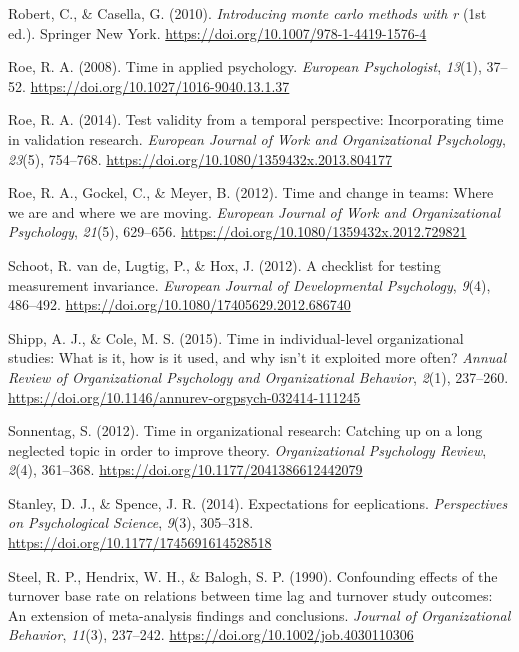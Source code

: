 \documentclass[
  english,
  man,floatsintext]{apa7}
\newlength{\cslhangindent}
\newlength{\cslentryspacingunit} %
\newenvironment{CSLReferences}[2] %
 {%
  \setlength{\parindent}{0pt}
  \ifodd #1
  \let\oldpar\par
  \def\par{\hangindent=\cslhangindent\oldpar}
  \fi
  \setlength{\parskip}{#2\cslentryspacingunit}
 }%
 {}
\begin{document}
\begin{CSLReferences}{1}{0}
\leavevmode{}%
Robert, C., \& Casella, G. (2010). \emph{Introducing monte carlo methods with r} (1st ed.). Springer New York. \url{https://doi.org/10.1007/978-1-4419-1576-4}

\leavevmode{}%
Roe, R. A. (2008). Time in applied psychology. \emph{European Psychologist}, \emph{13}(1), 37--52. \url{https://doi.org/10.1027/1016-9040.13.1.37}

\leavevmode{}%
Roe, R. A. (2014). Test validity from a temporal perspective: Incorporating time in validation research. \emph{European Journal of Work and Organizational Psychology}, \emph{23}(5), 754--768. \url{https://doi.org/10.1080/1359432x.2013.804177}

\leavevmode{}%
Roe, R. A., Gockel, C., \& Meyer, B. (2012). Time and change in teams: Where we are and where we are moving. \emph{European Journal of Work and Organizational Psychology}, \emph{21}(5), 629--656. \url{https://doi.org/10.1080/1359432x.2012.729821}

\leavevmode{}%
Schoot, R. van de, Lugtig, P., \& Hox, J. (2012). A checklist for testing measurement invariance. \emph{European Journal of Developmental Psychology}, \emph{9}(4), 486--492. \url{https://doi.org/10.1080/17405629.2012.686740}

\leavevmode{}%
Shipp, A. J., \& Cole, M. S. (2015). Time in individual-level organizational studies: What is it, how is it used, and why isn{'}t it exploited more often? \emph{Annual Review of Organizational Psychology and Organizational Behavior}, \emph{2}(1), 237--260. \url{https://doi.org/10.1146/annurev-orgpsych-032414-111245}

\leavevmode{}%
Sonnentag, S. (2012). Time in organizational research: Catching up on a long neglected topic in order to improve theory. \emph{Organizational Psychology Review}, \emph{2}(4), 361--368. \url{https://doi.org/10.1177/2041386612442079}

\leavevmode{}%
Stanley, D. J., \& Spence, J. R. (2014). Expectations for eeplications. \emph{Perspectives on Psychological Science}, \emph{9}(3), 305--318. \url{https://doi.org/10.1177/1745691614528518}

\leavevmode{}%
Steel, R. P., Hendrix, W. H., \& Balogh, S. P. (1990). Confounding effects of the turnover base rate on relations between time lag and turnover study outcomes: An extension of meta-analysis findings and conclusions. \emph{Journal of Organizational Behavior}, \emph{11}(3), 237--242. \url{https://doi.org/10.1002/job.4030110306}


\end{CSLReferences}
\end{document}
